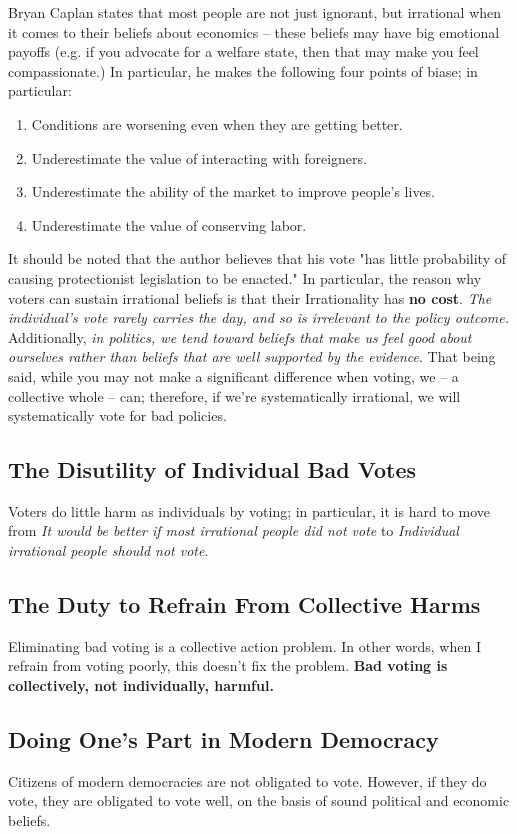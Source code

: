 \documentclass[letterpaper]{article}
\begin{document}
Bryan Caplan states that most people are not just ignorant, but irrational when it comes to their beliefs about economics -- these beliefs may have big emotional payoffs (e.g. if you advocate for a welfare state, then that may make you feel compassionate.) In particular, he makes the following four points of biase; in particular: 
\begin{enumerate}
    \item Conditions are worsening even when they are getting better. 
    \item Underestimate the value of interacting with foreigners. 
    \item Underestimate the ability of the market to improve people's lives. 
    \item Underestimate the value of conserving labor. 
\end{enumerate}

It should be noted that the author believes that his vote "has little probability of causing protectionist legislation to be enacted." In particular, the reason why voters can sustain irrational beliefs is that their Irrationality has \textbf{no cost}. \emph{The individual's vote rarely carries the day, and so is irrelevant to the policy outcome.} Additionally, \emph{in politics, we tend toward beliefs that make us feel good about ourselves rather than beliefs that are well supported by the evidence}. That being said, while you may not make a significant difference when voting, we -- a collective whole -- can; therefore, if we're systematically irrational, we will systematically vote for bad policies. 


\subsection{The Disutility of Individual Bad Votes}
Voters do little harm as individuals by voting; in particular, it is hard to move from \emph{It would be better if most irrational people did not vote} to \emph{Individual irrational people should not vote}.

\subsection{The Duty to Refrain From Collective Harms}
Eliminating bad voting is a collective action problem. In other words, when I refrain from voting poorly, this doesn't fix the problem. \textbf{Bad voting is collectively, not individually, harmful.}

\subsection{Doing One's Part in Modern Democracy}
Citizens of modern democracies are not obligated to vote. However, if they do vote, they are obligated to vote well, on the basis of sound political and economic beliefs. 
\end{document}
